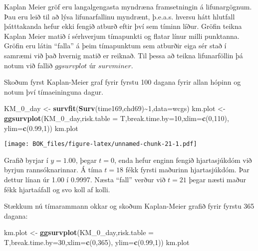 \documentclass[
]{book}
\newenvironment{Shaded}{\begin{snugshade}}{\end{snugshade}}
\newcommand{\DataTypeTok}[1]{\textcolor[rgb]{0.13,0.29,0.53}{#1}}
\newcommand{\DecValTok}[1]{\textcolor[rgb]{0.00,0.00,0.81}{#1}}
\newcommand{\FloatTok}[1]{\textcolor[rgb]{0.00,0.00,0.81}{#1}}
\newcommand{\KeywordTok}[1]{\textcolor[rgb]{0.13,0.29,0.53}{\textbf{#1}}}
\newcommand{\NormalTok}[1]{#1}
\newcommand{\OperatorTok}[1]{\textcolor[rgb]{0.81,0.36,0.00}{\textbf{#1}}}
\newcommand{\StringTok}[1]{\textcolor[rgb]{0.31,0.60,0.02}{#1}}
\begin{document}
Kaplan Meier gröf eru langalgengasta myndræna framsetningin á lifunargögnum. Þau eru leið til að lýsa lifunarfallinu myndrænt, þ.e.a.s. hversu hátt hlutfall þátttakanda hefur ekki fengið atburð eftir því sem tíminn líður. Gröfin teikna Kaplan Meier matið í sérhverjum tímapunkti og flatar línur milli punktanna. Gröfin eru látin ``falla'' á þeim tímapunktum sem atburðir eiga sér stað í samræmi við það hvernig matið er reiknað. Til þessa að teikna lifunarföllin þá notum við fallið \(ggsurvplot\) úr \(survminer\).

Skoðum fyrst Kaplan-Meier graf fyrir fyrstu 100 dagana fyrir allan hópinn og notum því tímaeininguna dagur.

\begin{Shaded}
\begin{Highlighting}[]
\NormalTok{KM\_}\DecValTok{0}\NormalTok{\_day <{-}}\StringTok{ }\KeywordTok{survfit}\NormalTok{(}\KeywordTok{Surv}\NormalTok{(time169,chd69)}\OperatorTok{\textasciitilde{}}\DecValTok{1}\NormalTok{,}\DataTypeTok{data=}\NormalTok{wcgs)}
\NormalTok{km.plot <{-}}\StringTok{ }\KeywordTok{ggsurvplot}\NormalTok{(KM\_}\DecValTok{0}\NormalTok{\_day,}\DataTypeTok{risk.table =}\NormalTok{ T,}\DataTypeTok{break.time.by=}\DecValTok{10}\NormalTok{,}\DataTypeTok{xlim=}\KeywordTok{c}\NormalTok{(}\DecValTok{0}\NormalTok{,}\DecValTok{110}\NormalTok{),}
                      \DataTypeTok{ylim=}\KeywordTok{c}\NormalTok{(}\FloatTok{0.99}\NormalTok{,}\DecValTok{1}\NormalTok{)) }
\NormalTok{km.plot }
\end{Highlighting}
\end{Shaded}

\texttt{[image: BOK\_files/figure-latex/unnamed-chunk-21-1.pdf]}

Grafið byrjar í \(y=1.00\), þegar \(t=0\), enda hefur enginn fengið hjartasjúkdóm við byrjun rannsóknarinnar. Á tíma \(t=18\) fékk fyrsti maðurinn hjartasjúkdóm. Þar dettur línan úr 1.00 í 0.9997. Næsta ``fall'' verður við \(t=21\) þegar næsti maður fékk hjartaáfall og svo koll af kolli.

Stækkum nú tímarammann okkar og skoðum Kaplan-Meier grafið fyrir fyrstu 365 dagana:

\begin{Shaded}
\begin{Highlighting}[]
\NormalTok{km.plot <{-}}\StringTok{ }\KeywordTok{ggsurvplot}\NormalTok{(KM\_}\DecValTok{0}\NormalTok{\_day,}\DataTypeTok{risk.table =}\NormalTok{ T,}\DataTypeTok{break.time.by=}\DecValTok{30}\NormalTok{,}\DataTypeTok{xlim=}\KeywordTok{c}\NormalTok{(}\DecValTok{0}\NormalTok{,}\DecValTok{365}\NormalTok{),}
                      \DataTypeTok{ylim=}\KeywordTok{c}\NormalTok{(}\FloatTok{0.99}\NormalTok{,}\DecValTok{1}\NormalTok{)) }
\NormalTok{km.plot }
\end{Highlighting}
\end{Shaded}
\end{document}
